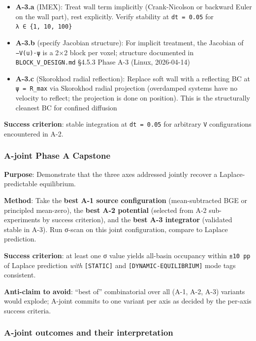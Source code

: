 \documentclass[
]{article}
\providecommand{\tightlist}{%
  \setlength{\itemsep}{0pt}\setlength{\parskip}{0pt}}
\begin{document}
\begin{itemize}
\tightlist
\item
  \textbf{A-3.a} (IMEX): Treat wall term implicitly (Crank-Nicolson or
  backward Euler on the wall part), rest explicitly. Verify stability at
  \texttt{dt\ =\ 0.05} for \texttt{λ\ ∈\ \{1,\ 10,\ 100\}}
\item
  \textbf{A-3.b} (specify Jacobian structure): For implicit treatment,
  the Jacobian of \texttt{−V\textquotesingle{}(u)·ψ} is a 2×2 block per
  voxel; structure documented in \texttt{BLOCK\_V\_DESIGN.md} §4.5.3
  Phase A-3 (Linux, 2026-04-14)
\item
  \textbf{A-3.c} (Skorokhod radial reflection): Replace soft wall with a
  reflecting BC at \texttt{\textbar{}ψ\textbar{}\ =\ R\_max} via
  Skorokhod radial projection (overdamped systems have no velocity to
  reflect; the projection is done on position). This is the structurally
  cleanest BC for confined diffusion
\end{itemize}

\textbf{Success criterion}: stable integration at \texttt{dt\ =\ 0.05}
for arbitrary \texttt{V} configurations encountered in A-2.

\hypertarget{a-joint-phase-a-capstone}{%
\subsubsection{A-joint Phase A
Capstone}\label{a-joint-phase-a-capstone}}

\textbf{Purpose}: Demonstrate that the three axes addressed jointly
recover a Laplace-predictable equilibrium.

\textbf{Method}: Take the \textbf{best A-1 source configuration}
(mean-subtracted BGE or principled mean-zero), the \textbf{best A-2
potential} (selected from A-2 sub-experiments by success criterion), and
the \textbf{best A-3 integrator} (validated stable in A-3). Run σ-scan
on this joint configuration, compare to Laplace prediction.

\textbf{Success criterion}: at least one σ value yields all-basin
occupancy within \texttt{±10\ pp} of Laplace prediction \emph{with}
\texttt{{[}STATIC{]}} and \texttt{{[}DYNAMIC-EQUILIBRIUM{]}} mode tags
consistent.

\textbf{Anti-claim to avoid}: ``best of'' combinatorial over all (A-1,
A-2, A-3) variants would explode; A-joint commits to one variant per
axis as decided by the per-axis success criteria.

\hypertarget{a-joint-outcomes-and-their-interpretation}{%
\subsubsection{A-joint outcomes and their
interpretation}\label{a-joint-outcomes-and-their-interpretation}}
\end{document}
